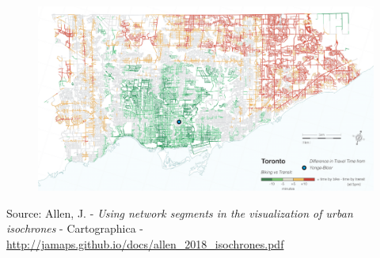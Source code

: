\documentclass[aspectratio=169]{beamer}
\begin{document}
\begin{frame}
	
	\begin{figure}
		\centering
		\includegraphics[width=1\linewidth]{images/bike_vs_transit}
	\end{figure}
	
	\tiny Source: Allen, J. - \textit{Using network segments in the visualization of urban isochrones} -  Cartographica - \url{http://jamaps.github.io/docs/allen_2018_isochrones.pdf}
	
\end{frame}
\end{document}
